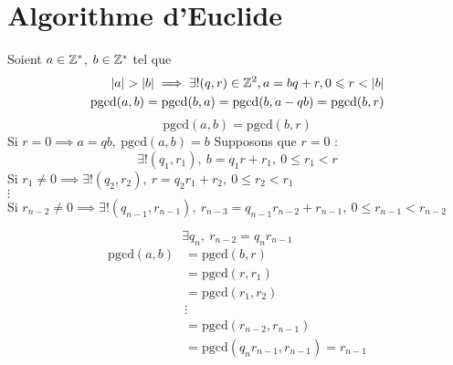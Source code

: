 \section{Algorithme d'Euclide}
\begin{graybox}
\begin{proposition}
Soient $a \in \mathbb{Z}^*$, $b \in \mathbb{Z}^*$ tel que 
\begin{align*}
|a| > |b| \implies \exists ! (q, r) \in \mathbb{Z}^2, a = b q + r, 0 \leqslant r < |b| \\
\mathrm{pgcd}(a, b) = \mathrm{pgcd}(b, a) = \mathrm{pgcd}(b, a - qb) = \mathrm{pgcd}(b, r) \\
\end{align*}
\begin{equation*}
\mathrm{pgcd}(a, b) = \mathrm{pgcd}(b, r)
\end{equation*}
Si $r = 0 \implies a = q b,\ \mathrm{pgcd}(a, b) = b$ 
Supposons que $r = 0$ :
\begin{equation*}
\exists ! (q_1, r_1),\ b = q_1 r + r_1, \ 0 \leq r_1 < r
\end{equation*}
Si $r_1 \neq 0 \implies \exists ! (q_2, r_2),\ r = q_2 r_1 + r_2,\ 0 \leq r_2 < r_1$ \\
$\vdots$ \\
Si $r_{n - 2} \neq 0 \implies \exists ! (q_{n - 1}, r_{n - 1}),\ r_{n - 3} = q_{n-1}r_{n-2} + r_{n - 1},\ 0 \leq r_{n-1} < r_{n-2}$

\begin{equation*}
\exists q_n,\ r_{n-2} = q_n r_{n-1}
\end{equation*}
\begin{align*}
\mathrm{pgcd}(a, b) &= \mathrm{pgcd}(b, r) \\
				   &= \mathrm{pgcd}(r, r_1) \\
				   &= \mathrm{pgcd}(r_1, r_2) \\
				   &\vdots \\
				   &= \mathrm{pgcd}(r_{n-2}, r_{n-1}) \\
				   &= \mathrm{pgcd}(q_n r_{n-1}, r_{n-1}) = r_{n-1}
\end{align*}
\end{proposition}
\end{graybox}

